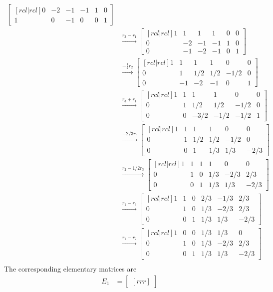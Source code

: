 \begin{solution}
\begin{align*}
\begin{bmatrix}[rcl|rcl]
0&-2&-1&-1&1&0\\
1&0&-1&0&0&1
\end{bmatrix}\\
&\xrightarrow[]{r_3-r_1}
\begin{bmatrix}[rcl|rcl]
1&1&1&1&0&0\\
0&-2&-1&-1&1&0\\
0&-1&-2&-1&0&1
\end{bmatrix}\\
&\xrightarrow[]{-\frac{1}{2}r_2}
\begin{bmatrix}[rcl|rcl]
1&1&1&1&0&0\\
0&1&1/2&1/2&-1/2&0\\
0&-1&-2&-1&0&1
\end{bmatrix}\\
&\xrightarrow[]{r_3+r_1}
\begin{bmatrix}[rcl|rcl]
1&1&1&1&0&0\\
0&1&1/2&1/2&-1/2&0\\
0&0&-3/2&-1/2&-1/2&1
\end{bmatrix}\\
&\xrightarrow[]{-2/3 r_3}
\begin{bmatrix}[rcl|rcl]
1&1&1&1&0&0\\
0&1&1/2&1/2&-1/2&0\\
0&0&1&1/3&1/3&-2/3
\end{bmatrix}\\
&\xrightarrow[]{r_2-1/2r_3}
\begin{bmatrix}[rcl|rcl]
1&1&1&1&0&0\\
0&1&0&1/3&-2/3&2/3\\
0&0&1&1/3&1/3&-2/3
\end{bmatrix}\\
&\xrightarrow[]{r_1-r_3}
\begin{bmatrix}[rcl|rcl]
1&1&0&2/3&-1/3&2/3\\
0&1&0&1/3&-2/3&2/3\\
0&0&1&1/3&1/3&-2/3
\end{bmatrix}\\
&\xrightarrow[]{r_1-r_2}
\begin{bmatrix}[rcl|rcl]
1&0&0&1/3&1/3&0\\
0&1&0&1/3&-2/3&2/3\\
0&0&1&1/3&1/3&-2/3
\end{bmatrix}\\
\end{align*}
The corresponding elementary matrices are
\begin{align*}
E_1&=\begin{bmatrix}[rrr]

\end{bmatrix}
\end{align*}
\end{solution}
